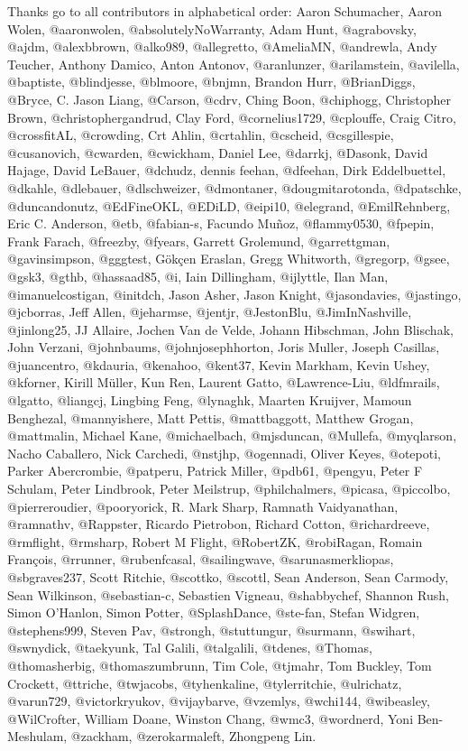Thanks go to all contributors in alphabetical order: Aaron Schumacher,
Aaron Wolen, @aaronwolen, @absolutelyNoWarranty, Adam Hunt, @agrabovsky,
@ajdm, @alexbbrown, @alko989, @allegretto, @AmeliaMN, @andrewla, Andy
Teucher, Anthony Damico, Anton Antonov, @aranlunzer, @arilamstein,
@avilella, @baptiste, @blindjesse, @blmoore, @bnjmn, Brandon Hurr,
@BrianDiggs, @Bryce, C. Jason Liang, @Carson, @cdrv, Ching Boon,
@chiphogg, Christopher Brown, @christophergandrud, Clay Ford,
@cornelius1729, @cplouffe, Craig Citro, @crossfitAL, @crowding, Crt
Ahlin, @crtahlin, @cscheid, @csgillespie, @cusanovich, @cwarden,
@cwickham, Daniel Lee, @darrkj, @Dasonk, David Hajage, David LeBauer,
@dchudz, dennis feehan, @dfeehan, Dirk Eddelbuettel, @dkahle, @dlebauer,
@dlschweizer, @dmontaner, @dougmitarotonda, @dpatschke, @duncandonutz,
@EdFineOKL, @EDiLD, @eipi10, @elegrand, @EmilRehnberg, Eric C. Anderson,
@etb, @fabian-s, Facundo Muñoz, @flammy0530, @fpepin, Frank Farach,
@freezby, @fyears, Garrett Grolemund, @garrettgman, @gavinsimpson,
@gggtest, Gökçen Eraslan, Gregg Whitworth, @gregorp, @gsee, @gsk3,
@gthb, @hassaad85, @i, Iain Dillingham, @ijlyttle, Ilan Man,
@imanuelcostigan, @initdch, Jason Asher, Jason Knight, @jasondavies,
@jastingo, @jcborras, Jeff Allen, @jeharmse, @jentjr, @JestonBlu,
@JimInNashville, @jinlong25, JJ Allaire, Jochen Van de Velde, Johann
Hibschman, John Blischak, John Verzani, @johnbaums, @johnjosephhorton,
Joris Muller, Joseph Casillas, @juancentro, @kdauria, @kenahoo, @kent37,
Kevin Markham, Kevin Ushey, @kforner, Kirill Müller, Kun Ren, Laurent
Gatto, @Lawrence-Liu, @ldfmrails, @lgatto, @liangcj, Lingbing Feng,
@lynaghk, Maarten Kruijver, Mamoun Benghezal, @mannyishere, Matt Pettis,
@mattbaggott, Matthew Grogan, @mattmalin, Michael Kane, @michaelbach,
@mjsduncan, @Mullefa, @myqlarson, Nacho Caballero, Nick Carchedi,
@nstjhp, @ogennadi, Oliver Keyes, @otepoti, Parker Abercrombie,
@patperu, Patrick Miller, @pdb61, @pengyu, Peter F Schulam, Peter
Lindbrook, Peter Meilstrup, @philchalmers, @picasa, @piccolbo,
@pierreroudier, @pooryorick, R. Mark Sharp, Ramnath Vaidyanathan,
@ramnathv, @Rappster, Ricardo Pietrobon, Richard Cotton, @richardreeve,
@rmflight, @rmsharp, Robert M Flight, @RobertZK, @robiRagan, Romain
François, @rrunner, @rubenfcasal, @sailingwave, @sarunasmerkliopas,
@sbgraves237, Scott Ritchie, @scottko, @scottl, Sean Anderson, Sean
Carmody, Sean Wilkinson, @sebastian-c, Sebastien Vigneau, @shabbychef,
Shannon Rush, Simon O'Hanlon, Simon Potter, @SplashDance, @ste-fan,
Stefan Widgren, @stephens999, Steven Pav, @strongh, @stuttungur,
@surmann, @swihart, @swnydick, @taekyunk, Tal Galili, @talgalili, @tdenes,
@Thomas, @thomasherbig, @thomaszumbrunn, Tim Cole, @tjmahr, Tom Buckley,
Tom Crockett, @ttriche, @twjacobs, @tyhenkaline, @tylerritchie,
@ulrichatz, @varun729, @victorkryukov, @vijaybarve, @vzemlys, @wchi144,
@wibeasley, @WilCrofter, William Doane, Winston Chang, @wmc3, @wordnerd,
Yoni Ben-Meshulam, @zackham, @zerokarmaleft, Zhongpeng Lin.

